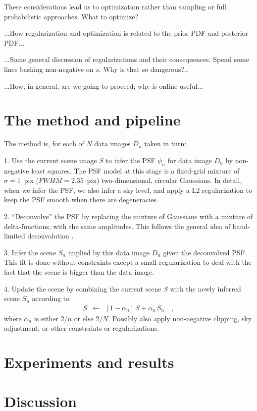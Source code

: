 \documentclass[12pt,preprint]{aastex}
\begin{document}
These considerations lead us to optimization rather than sampling or
full probabilistic approaches.  What to optimize?

...How regularization and optimization is related to the prior PDF and posterior PDF...

...Some general discussion of regularizations and their consequences.
Spend some lines bashing non-negative on $s$.  Why is that so
dangerous?..

...How, in general, are we going to proceed; why is online useful...

\section{The method and pipeline}

The method is, for each of $N$ data images $D_n$ taken in turn:

1. Use the current scene image $S$ to infer the PSF $\psi_n$ for data
image $D_n$ by non-negative least squares.  The PSF model at this
stage is a fixed-grid mixture of $\sigma=1$~pix ($FWHM = 2.35$~pix)
two-dimensional, circular Gaussians.  In detail, when we infer the
PSF, we also infer a sky level, and apply a L2 regularization to keep
the PSF smooth when there are degeneracies.

2. ``Deconvolve'' the PSF by replacing the mixture of Gaussians with a
mixture of delta-functions, with the same amplitudes.  This follows
the general idea of band-limited deconvolution \citep{magain}.

3. Infer the scene $S_n$ implied by this data image $D_n$ given the
deconvolved PSF.  This fit is done without constraints except a small
regularization to deal with the fact that the scene is bigger than the
data image.

4. Update the scene by combining the current scene $S$ with the newly
inferred scene $S_n$ according to
\begin{eqnarray}\displaystyle
S &\leftarrow& [1-\alpha_n]\,S + \alpha_n\,S_n
\quad ,
\end{eqnarray}
where $\alpha_n$ is either $2/n$ or else $2/N$.  Possibly also apply
non-negative clipping, sky adjustment, or other constraints or
regularizations.

\section{Experiments and results}

\section{Discussion}
\end{document}
